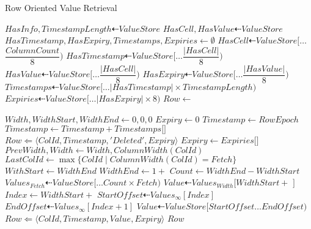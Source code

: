 \documentclass[fleqn]{article}
\begin{document}
\begin{algorithm}
\scriptsize
\caption{Row Oriented Value Retrieval}
\begin{algorithmic}[1]
\State $HasInfo, TimestampLength \dashleftarrow ValueStore$
\State $HasCell, HasValue \dashleftarrow ValueStore$
\State $HasTimestamp, HasExpiry, Timestamps, Expiries \gets \emptyset$
 \State $HasCell \dashleftarrow ValueStore[\dots $\tiny$\dfrac{ColumnCount}{8})$\scriptsize
\EndIf
{}
 \State $HasTimestamp \dashleftarrow ValueStore[\dots $\tiny$\dfrac{\lvert HasCell \rvert}{8})$\scriptsize
\EndIf
{}
 \State $HasValue \dashleftarrow ValueStore[\dots $\tiny$\dfrac{\lvert HasCell \rvert}{8})$\scriptsize
\EndIf
{}
 \State $HasExpiry\dashleftarrow ValueStore[\dots $\tiny$\dfrac{\lvert HasValue \rvert}{8})$\scriptsize
\EndIf
{}
 \State $Timestamps \dashleftarrow ValueStore[\dots $\tiny$\lvert HasTimestamp \rvert \times TimestampLength)$\scriptsize
\EndIf
{}
 \State $Expiries \dashleftarrow ValueStore[\dots $\tiny$\lvert HasExpiry \rvert \times 8)$\scriptsize
\EndIf
\Statex
\State $Row \gets $ 

\State $Width, WidthStart, WidthEnd \gets 0, 0, 0$
  \State $Expiry \gets 0$
  \State $Timestamp \gets RowEpoch$
   \State $Timestamp \gets Timestamp + Timestamps[$$]$
  \EndIf
   \State $Row \Leftarrow \langle ColId, Timestamp, 'Deleted', Expiry \rangle$
  \Else
    \State $Expiry \gets Expiries[$$]$
   \EndIf
    \State $PrevWidth, Width \gets Width, ColumnWidth(ColId)$
     \State $LastColId \gets \max{\{ColId \mid ColumnWidth(ColId) = Fetch\}}$
     \State $WithStart \gets WidthEnd$
     \State $WidthEnd \gets 1 + $ 
     \State $Count \gets WidthEnd - WidthStart$
     \State $Values_{Fetch} \dashleftarrow ValueStore[\dots Count \times Fetch)$
    \EndFor
   \EndIf
    \State $Value \dashleftarrow Values_{Width}[WidthStart + $ $]$
   \Else
    \State $Index \gets WidthStart + $ 
    \State $StartOffset \dashleftarrow Values_{\infty}[Index]$
    \State $EndOffset \dashleftarrow Values_{\infty}[Index + 1]$
    \State $Value \dashleftarrow ValueStore[StartOffset \dots EndOffset)$
   \EndIf
   \State $Row \Leftarrow \langle ColId, Timestamp, Value, Expiry \rangle$
  \EndIf
 \EndIf
\EndFor
\State \Return $Row$
\EndFunction
\end{algorithmic}
\end{algorithm}
\end{document}
